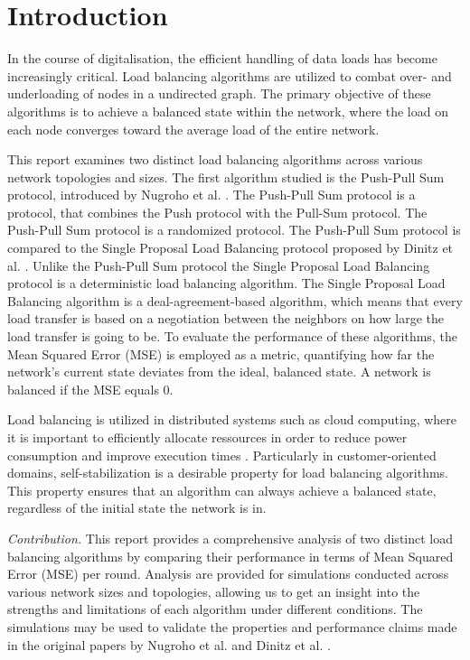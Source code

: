 \chapter{Introduction}\label{chap:introduction}
In the course of digitalisation, the efficient handling of data loads has become increasingly critical. Load balancing algorithms are utilized to combat over- and underloading of nodes in a undirected graph. The primary objective of these algorithms is to achieve a balanced state within the network, where the load on each node converges toward the average load of the entire network. 

This report examines two distinct load balancing algorithms across various network topologies and sizes. The first algorithm studied is the Push-Pull Sum protocol, introduced by Nugroho et al. \cite{nugroho2023PushPullSumDataAg}. The Push-Pull Sum protocol is a protocol, that combines the Push protocol \cite{kempe2003gossipbasedComp} with the Pull-Sum protocol. The Push-Pull Sum protocol is a randomized protocol. The Push-Pull Sum protocol is compared to the Single Proposal Load Balancing protocol proposed by Dinitz et al. \cite{dinitz2022localDealAgreementloadBalancing}. Unlike the Push-Pull Sum protocol the Single Proposal Load Balancing protocol is a deterministic load balancing algorithm. The Single Proposal Load Balancing algorithm is a deal-agreement-based algorithm, which means that every load transfer is based on a negotiation between the neighbors on how large the load transfer is going to be. To evaluate the performance of these algorithms, the Mean Squared Error (MSE) is employed as a metric, quantifying how far the network's current state deviates from the ideal, balanced state. A network is balanced if the MSE equals 0.

Load balancing is utilized in distributed systems such as cloud computing, where it is important to efficiently allocate ressources in order to reduce power consumption and improve execution times \cite{Aghdashi2022NovelDynamicLoadBalancing}. Particularly in customer-oriented domains, self-stabilization is a desirable property for load balancing algorithms. This property ensures that an algorithm can always achieve a balanced state, regardless of the initial state the network is in.

\textit{Contribution.} This report provides a comprehensive analysis of two distinct load balancing algorithms by comparing their performance in terms of Mean Squared Error (MSE) per round. Analysis are provided for simulations conducted across various network sizes and topologies, allowing us to get an insight into the strengths and limitations of each algorithm under different conditions. The simulations may be used to validate the properties and performance claims made in the original papers by Nugroho et al. \cite{nugroho2023PushPullSumDataAg} and Dinitz et al. \cite{dinitz2022localDealAgreementloadBalancing}.


